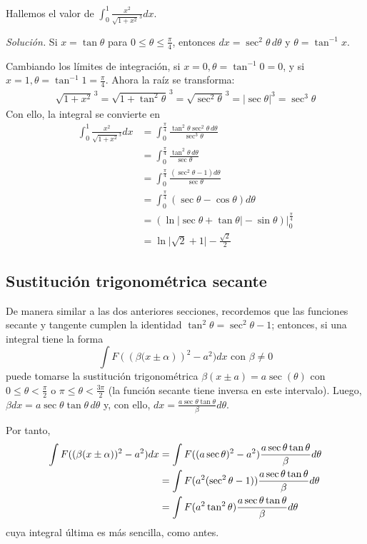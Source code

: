   \begin{ejemplo} Hallemos el valor de $\int_{0}^{1}\frac{x^{2}}{\sqrt{1+x^{2}}^{\,3}}dx$.
  \end{ejemplo}

  \emph{Solución.} Si $x=\tan \theta $ para $0\leq\theta\leq\frac{\pi}{4}$, entonces $dx=\sec ^{2}\theta\,d\theta $ y $\theta =\tan^{-1} x $.

  Cambiando los límites de integración, si $x=0, \theta =\tan^{-1} 0 =0 $, y si $x=1, \theta =\tan^{-1} 1 =\frac{\pi}{4} $. Ahora la raíz se transforma:
  \begin{align*}
    \sqrt{1+x^{2}}^{\,3}
    =\sqrt{1+\tan ^{2}\theta}^{\,3}
    =\sqrt{\sec ^{2}\theta }^{\,3}=|\sec\theta|^{3}
    =\sec^{3} \theta
  \end{align*}
  Con ello, la integral se convierte en
  \begin{align*}
    \int_{0}^{1}\frac{x^{2}}{\sqrt{1+x^{2}}^{3}}dx&=\int_{0}^{\frac{\pi}{4}}\frac{\tan^{2}\theta\sec^{2}\theta\,d\theta}{\sec^{3}\theta}\\
    &=\int_{0}^{\frac{\pi}{4}}\frac{\tan^{2}\theta\,d\theta}{\sec\theta}\\
    &=\int_{0}^{\frac{\pi}{4}}\frac{(\sec^{2}\theta-1) d\theta}{\sec\theta}\\
    &=\int_{0}^{\frac{\pi}{4}}(\sec\theta-\cos\theta) d\theta\\
    &=\left( \ln\vert\sec\theta+\tan\theta\vert-\sin\theta \right)\big|_{0}^{\frac{\pi}{4}}\\
    &= \ln\vert\sqrt{2}+1\vert-\frac{\sqrt{2}}{2}
  \end{align*}

  \subsection{Sustitución trigonométrica secante}
  De manera similar a las dos anteriores secciones, recordemos que las funciones secante y tangente cumplen la identidad $\tan^2\theta=\sec^2\theta-1$; entonces, si una integral tiene la forma
  \[
    \int F(\left( \beta (x\pm \alpha \right) )^{2}-a^{2})dx\text{ con } \beta\neq 0
  \]
  puede tomarse la sustitución trigonométrica $\beta (x\pm a)=a\sec(\theta )$ con $0\leq \theta <\frac{\pi }{2}$ o $\pi \leq \theta <\frac{3\pi}{2}$ (la función secante tiene inversa en este intervalo). Luego, $\beta dx=a\sec \theta \tan \theta\,d\theta$ y, con ello, $dx=\frac{a\sec \theta\tan \theta }{\beta }d\theta $.

  Por tanto,
  \begin{align*}
    \int F(\left( \beta (x\pm \alpha \right) )^{2}-a^{2})dx &= \int F((a\sec\theta)^{2}-a^{2})\frac{a\sec \theta\tan \theta}{\beta }d\theta
    \\
    &= \int F(a^{2}(\sec ^{2}\theta-1))\frac{a\sec \theta\tan\theta}{%
    \beta }d\theta \\
    &= \int F(a^{2}\tan ^{2}\theta )\frac{a\sec \theta\tan\theta}{%
    \beta }d\theta
  \end{align*}
  cuya integral última es más sencilla, como antes.

